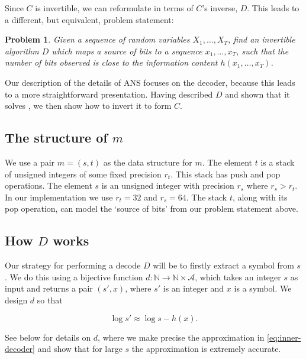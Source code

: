 \documentclass{article}
\newtheorem{problem}{Problem}
\begin{document}
Since $C$ is invertible, we can reformulate  in terms of
$C$'s inverse, $D$. This leads to a different, but equivalent, problem
statement:

\begin{problem}\label{prob:alt}
        Given a sequence of random variables $X_1, \ldots, X_T$, find an
        invertible algorithm $D$ which maps a source of bits to a sequence
        $x_1, \ldots, x_T$, such that the number of bits observed is close to
        the information content $h(x_1, \ldots, x_T)$.
\end{problem}

Our description of the details of ANS focuses on the decoder, because this
leads to a more straightforward presentation. Having described $D$ and shown
that it solves , we then show how to invert it to form $C$.


\subsection*{The structure of $m$}
We use a pair $m = (s, t)$ as the data structure for $m$. The element $t$ is a
stack of unsigned integers of some fixed precision $r_t$. This stack has push
and pop operations. The element $s$ is an unsigned integer with precision $r_s$
where $r_s > r_t$. In our implementation we use $r_t = 32$ and $r_s = 64$. The
stack $t$, along with its pop operation, can model the `source of bits' from
our problem statement above.

\subsection*{How $D$ works}
Our strategy for performing a decode $D$ will be to firstly extract a symbol
from $s$. We do this using a bijective function $d:\mathbb N\rightarrow\mathbb
N\times\mathcal{A}$, which takes an integer $s$ as input and returns a pair
$(s', x)$, where $s'$ is an integer and $x$ is a symbol. We design $d$ so that

\begin{equation}\label{eq:inner-decoder}
\log s' \approx \log s - h(x).
\end{equation}

See below for details on $d$, where we make precise the
approximation in \cref{eq:inner-decoder} and show that for large $s$ the
approximation is extremely accurate.
\end{document}
